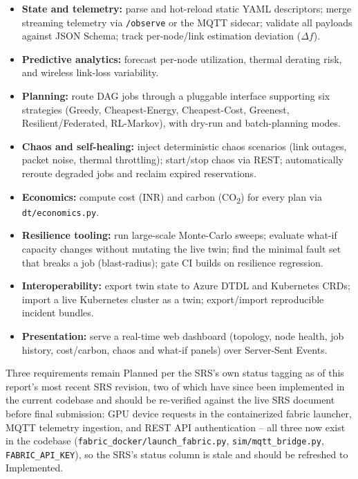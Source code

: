 \documentclass[12pt,a4]{report}
\begin{document}
\begin{itemize}
    \item \textbf{State and telemetry:} parse and hot-reload static YAML descriptors; merge streaming telemetry via \texttt{/observe} or the MQTT sidecar; validate all payloads against JSON Schema; track per-node/link estimation deviation ($\Delta f$).
    \item \textbf{Predictive analytics:} forecast per-node utilization, thermal derating risk, and wireless link-loss variability.
    \item \textbf{Planning:} route DAG jobs through a pluggable interface supporting six strategies (Greedy, Cheapest-Energy, Cheapest-Cost, Greenest, Resilient/Federated, RL-Markov), with dry-run and batch-planning modes.
    \item \textbf{Chaos and self-healing:} inject deterministic chaos scenarios (link outages, packet noise, thermal throttling); start/stop chaos via REST; automatically reroute degraded jobs and reclaim expired reservations.
    \item \textbf{Economics:} compute cost (INR) and carbon (CO\textsubscript{2}) for every plan via \texttt{dt/economics.py}.
    \item \textbf{Resilience tooling:} run large-scale Monte-Carlo sweeps; evaluate what-if capacity changes without mutating the live twin; find the minimal fault set that breaks a job (blast-radius); gate CI builds on resilience regression.
    \item \textbf{Interoperability:} export twin state to Azure DTDL and Kubernetes CRDs; import a live Kubernetes cluster as a twin; export/import reproducible incident bundles.
    \item \textbf{Presentation:} serve a real-time web dashboard (topology, node health, job history, cost/carbon, chaos and what-if panels) over Server-Sent Events.
\end{itemize}

Three requirements remain Planned per the SRS's own status tagging as of this report's most recent SRS revision, two of which have since been implemented in the current codebase and should be re-verified against the live SRS document before final submission: GPU device requests in the containerized fabric launcher, MQTT telemetry ingestion, and REST API authentication -- all three now exist in the codebase (\texttt{fabric\_docker/launch\_fabric.py}, \texttt{sim/mqtt\_bridge.py}, \texttt{FABRIC\_API\_KEY}), so the SRS's status column is stale and should be refreshed to Implemented.
\end{document}
